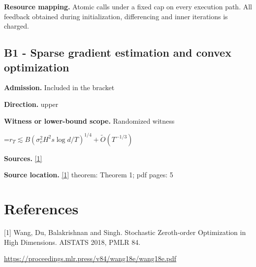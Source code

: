 \documentclass[10pt,a4paper]{article}
\newcommand{\AtlasMath}[1]{\par\begingroup\centering\setbox0=\hbox{$\displaystyle #1$}\ifdim\wd0>1.4\linewidth\typeout{ATLAS WIDE FORMULA: \the\wd0}\fi\ifdim\wd0>\linewidth\resizebox{\linewidth}{!}{\box0}\else\box0\fi\par\endgroup}
\begin{document}
\textbf{Resource mapping.} Atomic calls under a fixed cap on every execution path. All feedback obtained during initialization, differencing and inner iterations is charged.

\subsection{B1 - Sparse gradient estimation and convex optimization}
\textbf{Admission.} Included in the bracket

\textbf{Direction.} upper

\textbf{Witness or lower-bound scope.} Randomized witness

\AtlasMath{r_T\lesssim B(\sigma_v^2H^2s\log d/T)^{1/4}+\widetilde{O}(T^{-1/3})}
\textbf{Sources.} \href{https://proceedings.mlr.press/v84/wang18e/wang18e.pdf}{[1]}

\textbf{Source location.} \href{https://proceedings.mlr.press/v84/wang18e/wang18e.pdf}{[1]} theorem: Theorem 1; pdf pages: 5

\section{References}
[1] Wang, Du, Balakrishnan and Singh. Stochastic Zeroth-order Optimization in High Dimensions. AISTATS 2018, PMLR 84.

\url{https://proceedings.mlr.press/v84/wang18e/wang18e.pdf}
\end{document}
